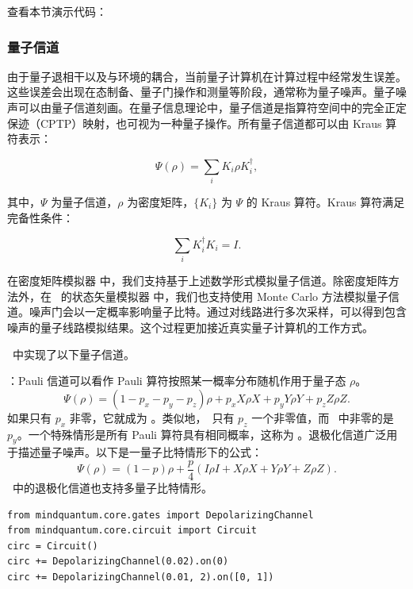 \label{sec:noise_simulation}

查看本节演示代码： \ 

\subsubsection{量子信道}
由于量子退相干以及与环境的耦合，当前量子计算机在计算过程中经常发生误差。这些误差会出现在态制备、量子门操作和测量等阶段，通常称为量子噪声。量子噪声可以由量子信道刻画。在量子信息理论中，量子信道是指算符空间中的完全正定保迹（CPTP）映射，也可视为一种量子操作。所有量子信道都可以由 Kraus 算符表示：

\begin{equation}
    \Psi(\rho) = \sum_i K_i \rho K_i^\dagger,
\end{equation}

其中，$\Psi$ 为量子信道，$\rho$ 为密度矩阵，$\{K_i\}$ 为 $\Psi$ 的 Kraus 算符。Kraus 算符满足完备性条件：

\begin{equation}
    \sum_i K_i^\dagger K_i = I.
\end{equation}

在密度矩阵模拟器  中，我们支持基于上述数学形式模拟量子信道。除密度矩阵方法外，在 \MindQuantum\ 的状态矢量模拟器  中，我们也支持使用 Monte Carlo 方法模拟量子信道。噪声门会以一定概率影响量子比特。通过对线路进行多次采样，可以得到包含噪声的量子线路模拟结果。这个过程更加接近真实量子计算机的工作方式。

\MindQuantum\ 中实现了以下量子信道。

\PauliChannel：Pauli 信道可以看作 Pauli 算符按照某一概率分布随机作用于量子态 $\rho$。
\begin{equation}
    \Psi(\rho) = (1-p_x-p_y-p_z) \rho + p_x X \rho X + p_y Y \rho Y + p_z Z \rho Z.
\end{equation}
如果只有 $p_x$ 非零，它就成为 \BitFlipChannel。类似地，\PhaseFlipChannel\ 只有 $p_z$ 一个非零值，而 \BitPhaseFlipChannel\ 中非零的是 $p_y$。一个特殊情形是所有 Pauli 算符具有相同概率，这称为 \DepolarizingChannel。退极化信道广泛用于描述量子噪声。以下是一量子比特情形下的公式：
\begin{equation}
    \Psi(\rho) =  (1-p) \rho + \frac{p}{4}(I\rho I+X\rho X+Y\rho Y+Z\rho Z).
\end{equation}
\MindQuantum\ 中的退极化信道也支持多量子比特情形。
\begin{lstlisting}
from mindquantum.core.gates import DepolarizingChannel
from mindquantum.core.circuit import Circuit
circ = Circuit()
circ += DepolarizingChannel(0.02).on(0)
circ += DepolarizingChannel(0.01, 2).on([0, 1])
\end{lstlisting}

